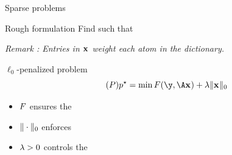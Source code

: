 \documentclass[10pt]{beamer}
\begin{document}
\begin{frame}{Sparse problems}
  \begin{center}
    \begin{minipage}{0.6\linewidth}
      \begin{block}{Rough formulation}
        \centering
        Find  such that 
      \end{block}
    \end{minipage}
  \end{center}
  \pause
  \begin{center}
    \emph{Remark : Entries in $\pv$ weight each atom in the dictionary.}
  \end{center}
  \pause
  \begin{center}
  \end{center}
  \vspace*{-0.5cm}
  \begin{center}
    \begin{minipage}{0.6\linewidth}
      \begin{block}{$\ell_0$-penalized problem}
        \begin{equation}
          \label{prob:prob} 
          \tag{\(\ppb\)}
          \optobj = \min \datafunc(\obs,\dic\pv) + \reg \norm{\pv}{0}
        \end{equation}
      \end{block}
    \end{minipage}
  \end{center}
  \pause
  \begin{itemize}
    \item $F$ ensures the 
    \item $\|\cdot\|_0$ enforces 
    \item $\lambda>0$ controls the 
  \end{itemize}
  \pause
  \begin{center}
  \end{center}
\end{frame}

\end{document}
